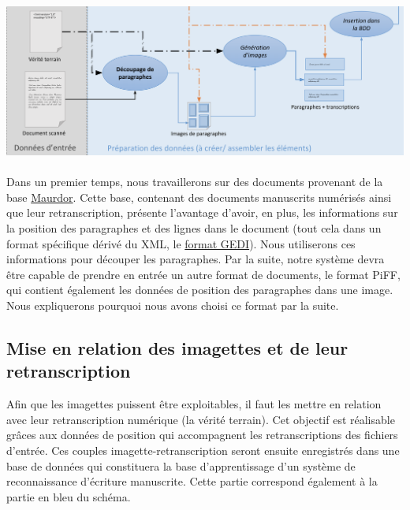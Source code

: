 \paragraph{}
\begin{mdframed}[frametitle={Partie traitement des données du projet (sans détection de lignes)}, innerbottommargin=10]
\begin{center}
\includegraphics[width=\linewidth]{sans-detection.png}
\end{center}
\end{mdframed}

\paragraph{}
Dans un premier temps, nous travaillerons sur des documents provenant de la base
\href{http://www.maurdor-campaign.org/}{Maurdor}. Cette base, contenant des documents manuscrits numérisés
ainsi que leur retranscription, présente l’avantage d’avoir, en plus, les informations sur la position des
paragraphes et des lignes dans le document (tout cela dans un format spécifique dérivé du XML, le
\href{https://lampsrv02.umiacs.umd.edu/projdb/project.php?id=53}{format GEDI}). Nous utiliserons ces informations
pour découper les paragraphes. Par la suite, notre système devra être capable de prendre en entrée un autre
format de documents, le format PiFF\cite{piff:2017}, qui contient également les données de position des
paragraphes dans une image. Nous expliquerons pourquoi nous avons choisi ce format par la suite.


\subsection{Mise en relation des imagettes et de leur retranscription}

Afin que les imagettes puissent être exploitables, il faut les mettre en relation avec leur retranscription
numérique (la vérité terrain). Cet objectif est réalisable grâces aux données de position qui accompagnent
les retranscriptions des fichiers d’entrée. Ces couples imagette-retranscription seront ensuite enregistrés
dans une base de données qui constituera la base d’apprentissage d’un système de reconnaissance d’écriture
manuscrite. Cette partie correspond également à la partie en bleu du schéma.

